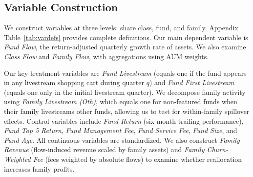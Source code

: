 \documentclass[12pt]{article}
\begin{document}


\subsection{Variable Construction}\label{subsec:variables}

We construct variables at three levels: share class, fund, and family. Appendix Table~\ref{tab:vardefs} provides complete definitions. Our main dependent variable is \textit{Fund Flow}, the return-adjusted quarterly growth rate of assets. We also examine \textit{Class Flow} and \textit{Family Flow}, with aggregations using AUM weights.

Our key treatment variables are \textit{Fund Livestream} (equals one if the fund appears in any livestream shopping cart during quarter $q$) and \textit{Fund First Livestream} (equals one only in the initial livestream quarter). We decompose family activity using \textit{Family Livestream (Oth)}, which equals one for non-featured funds when their family livestreams other funds, allowing us to test for within-family spillover effects. Control variables include \textit{Fund Return} (six-month trailing performance), \textit{Fund Top 5 Return}, \textit{Fund Management Fee}, \textit{Fund Service Fee}, \textit{Fund Size}, and \textit{Fund Age}. All continuous variables are standardized. We also construct \textit{Family Revenue} (flow-induced revenue scaled by family assets) and \textit{Family Churn-Weighted Fee} (fees weighted by absolute flows) to examine whether reallocation increases family profits.
\end{document}
